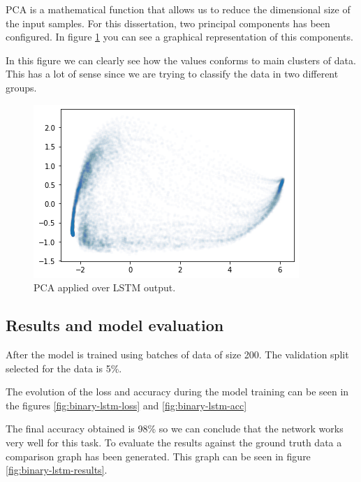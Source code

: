 PCA is a mathematical function that allows us to reduce the dimensional size of the input samples.
For this dissertation, two principal components has been configured.
In figure \ref{fig:binary-lstm-pca} you can see a graphical representation of this components.

In this figure we can clearly see how the values conforms to main clusters of data.
This has a lot of sense since we are trying to classify the data in two different groups.

\begin{figure}[H]
\centering
\includegraphics{Figures/lstm-visualization}
\decoRule
\caption[PCA applied over LSTM output]{PCA applied over LSTM output.}
\label{fig:binary-lstm-pca}
\end{figure}


\subsection{Results and model evaluation}

After the model is trained using batches of data of size 200.
The validation split selected for the data is 5\%.

The evolution of the loss and accuracy during the model training can be seen in the figures \ref{fig:binary-lstm-loss} and \ref{fig:binary-lstm-acc}

The final accuracy obtained is 98\% so we can conclude that the network works very well for this task. To evaluate the results against the ground truth data a comparison graph has been generated. This graph can be seen in figure \ref{fig:binary-lstm-results}.

